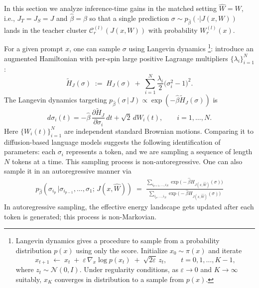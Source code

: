 \documentclass{article}
\theoremstyle{remark} %
\begin{document}
In this section we analyze inference-time gains in the matched setting $\hat W=W$, i.e., $J_T=J_S=J$ and $\hat\beta=\beta$
so that a single prediction $\sigma\sim p_{\hat\beta}(\cdot \vert J(x, W))$ lands in the
teacher cluster $\mathcal C^{(l)}_r(J(x,W))$ with probability $W^{(l)}_r(x)$.

 For a given prompt $x$, one can sample $\sigma$ using Langevin dynamics \citep{PARISI1981378}\footnote{Langevin dynamics gives a procedure to sample from a probability distribution $p(x)$ using only the score.
Initialize $x_0\sim \pi(x)$ and iterate
\begin{equation}
x_{t+1}\;\leftarrow\; x_t \;+\; \varepsilon\,\nabla_x \log p(x_t)\;+\;\sqrt{2\varepsilon}\,z_t,
\qquad t=0,1,\dots,K-1,
\label{eq:langevin_note}
\end{equation}
where $z_t\sim \mathcal N(0,I)$. Under regularity conditions, as $\varepsilon\to 0$ and $K\to\infty$ suitably,
$x_K$ converges in distribution to a sample from $p(x)$. }:
introduce an augmented Hamiltonian with per-spin large positive Lagrange multipliers $\{\lambda_i\}_{i=1}^N$:
\begin{equation}
\widetilde H_J(\sigma)
\;:=\;
H_J(\sigma)\;+\;\sum_{i=1}^N \frac{\lambda_i}{2}\big(\sigma_i^2-1\big)^2.
\label{eq:augmented_H}
\end{equation}
The  Langevin dynamics targeting $p_{\hat \beta}(\sigma\,|\,J) \propto \exp(-\hat \beta \widetilde H_J(\sigma))$ is
\begin{equation}
d\sigma_i(t)
=
-\hat \beta\,\frac{\partial \widetilde H_J}{\partial \sigma_i}\,dt
+\sqrt{2}\,dW_i(t),
\qquad i=1,\dots,N.
\label{eq:langevin_sde_spin_aug}
\end{equation}
Here $\{W_i(t)\}_{i=1}^N$ are independent standard Brownian motions. Comparing it to diffusion-based language models \citep{li2022diffusion} suggests the following identification of parameters: each $\sigma_i$ represents a token, and we are sampling a sequence of length $N$ tokens at a time. This sampling process is non-autoregressive. One can also sample it in an autoregressive manner via
\begin{equation}
    \begin{aligned}
        p_{\hat \beta}(\sigma_{i_{p}}\,|\sigma_{i_{p-1}},\dots, \sigma_{1};\,J(x,\hat W))\;=\;\frac{\sum_{i_{p+1}, \dots, i_N}\exp \big(-{\hat \beta} H_{J(x,\hat W)}(\sigma)\big)}{\sum_{i_{p}, \dots, i_N}\exp \big(-{\hat \beta} H_{J(x,\hat W)}(\sigma)\big)}
    \end{aligned}
\end{equation}
In autoregressive sampling, the effective energy landscape gets updated after each token is generated; this process is non-Markovian.
\end{document}
